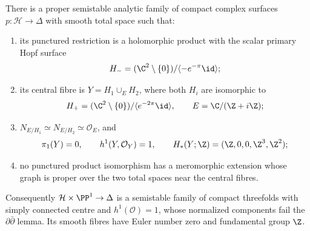 \begin{proposition}\hypertarget{tag-0317}{}\label{push:src:B.4.7}

There is a proper semistable analytic family of compact complex
surfaces $p:\mathcal H\to\Delta$ with smooth total space such that:
\begin{enumerate}
\item its punctured restriction is a holomorphic product with the
scalar primary Hopf surface
\[
 H_-=(\C^2\setminus\{0\})/\langle -e^{-\pi}\id\rangle;
\]
\item its central fibre is $Y=H_1\cup_E H_2$, where both $H_i$
are isomorphic to
\[
 H_+=(\C^2\setminus\{0\})/\langle e^{-2\pi}\id\rangle,
 \qquad E=\C/(\Z+i\Z);
\]
\item $N_{E/H_1}\simeq N_{E/H_2}\simeq\mathcal O_E$, and
\[
 \pi_1(Y)=0,\qquad h^1(Y,\mathcal O_Y)=1,
 \qquad H_*(Y;\Z)=(\Z,0,0,\Z^3,\Z^2);
\]
\item no punctured product isomorphism has a meromorphic extension
whose graph is proper over the two total spaces near the central
fibres.
\end{enumerate}
Consequently $\mathcal H\times\PP^1\to\Delta$ is a
semistable family of compact threefolds with simply connected centre
and $h^1(\mathcal O)=1$, whose normalized components fail the
$\partial\bar\partial$ lemma.  Its smooth fibres have Euler number
zero and fundamental group $\Z$.
\end{proposition}


